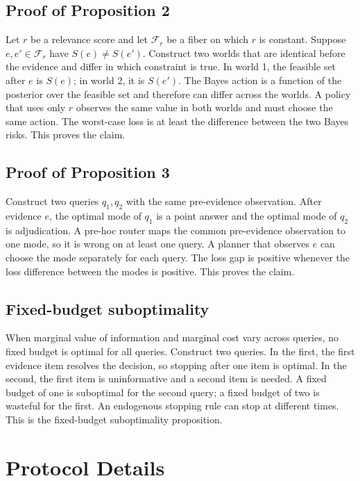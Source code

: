 \documentclass[11pt]{article}
\begin{document}
\subsection{Proof of Proposition 2}
Let $r$ be a relevance score and let $\mathcal F_r$ be a fiber on which $r$ is constant. Suppose $e,e'\in\mathcal F_r$ have $S(e)\neq S(e')$. Construct two worlds that are identical before the evidence and differ in which constraint is true. In world 1, the feasible set after $e$ is $S(e)$; in world 2, it is $S(e')$. The Bayes action is a function of the posterior over the feasible set and therefore can differ across the worlds. A policy that uses only $r$ observes the same value in both worlds and must choose the same action. The worst-case loss is at least the difference between the two Bayes risks. This proves the claim.

\subsection{Proof of Proposition 3}
Construct two queries $q_1,q_2$ with the same pre-evidence observation. After evidence $e$, the optimal mode of $q_1$ is a point answer and the optimal mode of $q_2$ is adjudication. A pre-hoc router maps the common pre-evidence observation to one mode, so it is wrong on at least one query. A planner that observes $e$ can choose the mode separately for each query. The loss gap is positive whenever the loss difference between the modes is positive. This proves the claim.

\subsection{Fixed-budget suboptimality}
When marginal value of information and marginal cost vary across queries, no fixed budget is optimal for all queries. Construct two queries. In the first, the first evidence item resolves the decision, so stopping after one item is optimal. In the second, the first item is uninformative and a second item is needed. A fixed budget of one is suboptimal for the second query; a fixed budget of two is wasteful for the first. An endogenous stopping rule can stop at different times. This is the fixed-budget suboptimality proposition.

\section{Protocol Details}
\label{app:protocol}
\end{document}
